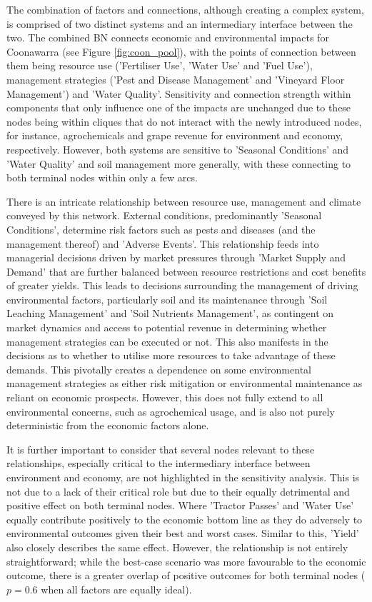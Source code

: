 \documentclass{article}
\begin{document}
The combination of factors and connections, although creating a complex system, is comprised of two distinct systems and an intermediary interface between the two. The combined BN connects economic and environmental impacts for Coonawarra (see Figure \ref{fig:coon_pool}), with the points of connection between them being resource use ('Fertiliser Use', 'Water Use' and 'Fuel Use'), management strategies ('Pest and Disease Management' and 'Vineyard Floor Management') and 'Water Quality'. Sensitivity and connection strength within components that only influence one of the impacts are unchanged due to these nodes being within cliques that do not interact with the newly introduced nodes, for instance, agrochemicals and grape revenue for environment and economy, respectively. However, both systems are sensitive to 'Seasonal Conditions' and 'Water Quality' and soil management more generally, with these connecting to both terminal nodes within only a few arcs.

There is an intricate relationship between resource use, management and climate conveyed by this network. External conditions, predominantly 'Seasonal Conditions', determine risk factors such as pests and diseases (and the management thereof) and 'Adverse Events'. This relationship feeds into managerial decisions driven by market pressures through 'Market Supply and Demand' that are further balanced between resource restrictions and cost benefits of greater yields. This leads to decisions surrounding the management of driving environmental factors, particularly soil and its maintenance through 'Soil Leaching Management' and 'Soil Nutrients Management', as contingent on market dynamics and access to potential revenue in determining whether management strategies can be executed or not. This also manifests in the decisions as to whether to utilise more resources to take advantage of these demands. This pivotally creates a dependence on some environmental management strategies as either risk mitigation or environmental maintenance as reliant on economic prospects. However, this does not fully extend to all environmental concerns, such as agrochemical usage, and is also not purely deterministic from the economic factors alone.

It is further important to consider that several nodes relevant to these relationships, especially critical to the intermediary interface between environment and economy, are not highlighted in the sensitivity analysis. This is not due to a lack of their critical role but due to their equally detrimental and positive effect on both terminal nodes. Where 'Tractor Passes' and 'Water Use' equally contribute positively to the economic bottom line as they do adversely to environmental outcomes given their best and worst cases. Similar to this, 'Yield' also closely describes the same effect. However, the relationship is not entirely straightforward; while the best-case scenario was more favourable to the economic outcome, there is a greater overlap of positive outcomes for both terminal nodes ($p=0.6$ when all factors are equally ideal).
\end{document}
